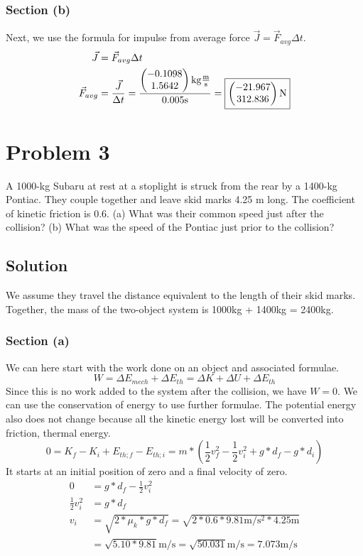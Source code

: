 \documentclass[12pt]{article}
\begin{document}
\subsubsection*{Section (b)}
Next, we use the formula for impulse from average force $\vec{J} = \vec{F}_{avg}\Delta t$.
\begin{align*}
    \vec{J} &=  \vec{F}_{avg}\Delta t\\
    \vec{F}_{avg}   &=  \frac{\vec{J}}{\Delta t}
        =   \frac{\begin{pmatrix} -0.1098 \\ 1.5642 \end{pmatrix} \unit{\kilo\gram\frac{\meter}{\second}}}{0.005 \unit{\second}}
        =   \boxed{ \begin{pmatrix} -21.967 \\ 312.836 \end{pmatrix} \unit{\newton} }
\end{align*}


\pagebreak
\section*{Problem 3}
A 1000-kg Subaru at rest at a stoplight is struck from the rear by a 1400-kg Pontiac. They couple together and leave skid marks 4.25 m long. The coefficient of kinetic friction is 0.6. (a) What was their common speed just after the collision? (b) What was the speed of the Pontiac just prior to the collision?

\subsection*{Solution}
We assume they travel the distance equivalent to the length of their skid marks. Together, the mass of the two-object system is 1000kg + 1400kg = 2400kg. 
\subsubsection*{Section (a)}
We can here start with the work done on an object and associated formulae.
\[ W = \Delta E_{mech} + \Delta E_{th} = \Delta K + \Delta U + \Delta E_{th} \]
Since this is no work added to the system after the collision, we have $W = 0$. We can use the conservation of energy to use further formulae. The potential energy also does not change because all the kinetic energy lost will be converted into friction, thermal energy.
\[ 0 = K_f - K_i + E_{th;f} - E_{th;i} = m*\left( \frac{1}{2}v_f^2 - \frac{1}{2}v_i^2 + g*d_f - g*d_i \right) \]
It starts at an initial position of zero and a final velocity of zero.
\begin{align*}
    0   &=  g*d_f - \frac{1}{2}v_i^2\\
    \frac{1}{2}v_i^2    &=  g*d_f\\
    v_i &=  \sqrt{2*\mu_k*g*d_f}
        =   \sqrt{2*0.6*9.81\unit{\meter/\second^2}*4.25\unit{\meter}}\\
        &=  \sqrt{5.10*9.81} \unit{\meter/\second}
        =   \sqrt{50.031}\unit{\meter/\second}
        =   \boxed{7.073\unit{\meter/\second}}
\end{align*}
\pagebreak
\end{document}
